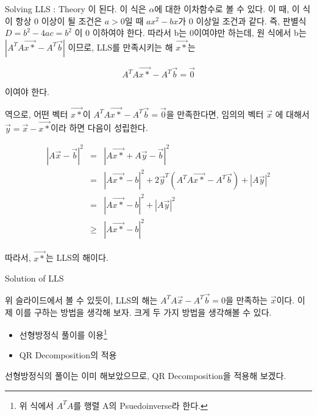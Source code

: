 \documentclass{beamer}
\begin{document}
\begin{frame}[allowframebreaks]{Solving LLS : Theory}
이 된다. 이 식은 $\alpha$에 대한 이차함수로 볼 수 있다. 이 때, 이 식이 항상 0 이상이 될 조건은 $a>0$일 때 $ax^2 - bx$가 0 이상일 조건과 같다. 즉, 판별식 $D = b^2-4ac = b^2$ 이 0 이하여야 한다. 따라서 b는 0이여야만 하는데, 원 식에서 b는 $|A^T A\vec{x*} - A^T \vec{b}|$ 이므로, LLS를 만족시키는 해 $\vec{x*}$는 

\begin{equation} 
A^T A\vec{x*} - A^T \vec{b} = \vec{0}
\end{equation}

이여야 한다. 

역으로, 어떤 벡터 $\vec{x*}$이 $A^T A\vec{x*} - A^T \vec{b} = \vec{0}$을 만족한다면, 임의의 벡터 $\vec{x}$ 에 대해서 $\vec{y} = \vec{x} - \vec{x*}$이라 하면 다음이 성립한다. 

\begin{eqnarray} 
|A\vec{x} - \vec{b}|^2 &=& |A\vec{x*} + A\vec{y} - \vec{b}|^2 \\ 
&=& |A\vec{x*}-b|^2 + 2\vec{y}^T(A^T A\vec{x*} - A^T\vec{b}) + |A\vec{y}|^2 \\ 
&=& |A\vec{x*}-b|^2 + |A\vec{y}|^2  \\
&\geq& |A\vec{x*}-b|^2 
\end{eqnarray}

따라서, $\vec{x*}$는 LLS의 해이다. 
\end{frame}

\begin{frame}{Solution of LLS}

위 슬라이드에서 볼 수 있듯이, LLS의 해는 $A^TA\vec{x} -  A^T\vec{b} = 0$을 만족하는 $\vec{x}$이다. 이제 이를 구하는 방법을 생각해 보자. 크게 두 가지 방법을 생각해볼 수 있다. 

\begin{itemize} 
\item 선형방정식 풀이를 이용\footnote{위 식에서 $A^TA$를 행렬 A의 Psuedoinverse라 한다.}
\item QR Decomposition의 적용 
\end{itemize}

선형방정식의 풀이는 이미 해보았으므로, QR Decomposition을 적용해 보겠다. 

\end{frame}
\end{document}
